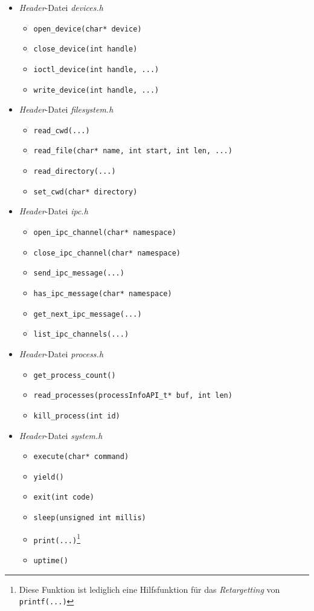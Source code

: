 \begin{itemize}
\item \textit{Header}-Datei \textit{devices.h}
\begin{itemize}
\item \texttt{open\_device(char* device)}
\item \texttt{close\_device(int handle)}
\item \texttt{ioctl\_device(int handle, ...)}
\item \texttt{write\_device(int handle, ...)}
\end{itemize}

\item \textit{Header}-Datei \textit{filesystem.h}
\begin{itemize}
\item \texttt{read\_cwd(...)}
\item \texttt{read\_file(char* name, int start, int len, ...)}
\item \texttt{read\_directory(...)}
\item \texttt{set\_cwd(char* directory)}
\end{itemize}

\item \textit{Header}-Datei \textit{ipc.h}
\begin{itemize}
\item \texttt{open\_ipc\_channel(char* namespace)}
\item \texttt{close\_ipc\_channel(char* namespace)}
\item \texttt{send\_ipc\_message(...)}
\item \texttt{has\_ipc\_message(char* namespace)}
\item \texttt{get\_next\_ipc\_message(...)}
\item \texttt{list\_ipc\_channels(...)}
\end{itemize}

\item \textit{Header}-Datei \textit{process.h}
\begin{itemize}
\item \texttt{get\_process\_count()}
\item \texttt{read\_processes(processInfoAPI\_t* buf, int len)}
\item \texttt{kill\_process(int id)}

\end{itemize}

\item \textit{Header}-Datei \textit{system.h}
\begin{itemize}
\item \texttt{execute(char* command)}
\item \texttt{yield()}
\item \texttt{exit(int code)}
\item \texttt{sleep(unsigned int millis)}
\item \texttt{print(...)}\footnote{Diese Funktion ist lediglich eine Hilfsfunktion für das \textit{Retargetting} von \texttt{printf(...)}}
\item \texttt{uptime()}
\end{itemize}

\end{itemize}

\pagebreak 
